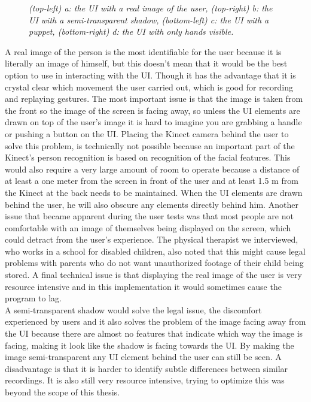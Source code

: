 \begin{figure}[H]
\begin{center}
 		\caption{\emph{(top-left) a: the UI with a real image of the user, (top-right) b: the UI with a semi-transparent shadow, (bottom-left) c: the UI with a puppet, (bottom-right) d: the UI with only hands visible. }}
 		\label{user visualizations}
 	\end{center}
 \end{figure}
 
 
A real image of the person is the most identifiable for the user because it is literally an image of himself, but this doesn't mean that it would be the best option to use in interacting with the UI. Though it has the advantage that it is crystal clear which movement the user carried out, which is good for recording and replaying gestures. The most important issue is that the image is taken from the front so the image of the screen is facing away, so unless the UI elements are drawn on top of the user's image it is hard to imagine you are grabbing a handle or pushing a button on the UI. Placing the Kinect camera behind the user to solve this problem, is technically not possible because an important part of the Kinect's person recognition is based on recognition of the facial features. This would also require a very large amount of room to operate because a distance of at least a one meter from the screen in front of the user and at least 1.5 m from the Kinect at the back needs to be maintained. When the UI elements are drawn behind the user, he will also obscure any elements directly behind him. Another issue that became apparent during the user tests was that most people are not comfortable with an image of themselves being displayed on the screen, which could detract from the user's experience. The physical therapist we interviewed, who works in a school for disabled children, also noted that this might cause legal problems with parents who do not want unauthorized footage of their child being stored. A final technical issue is that displaying the real image of the user is very resource intensive and in this implementation it would sometimes cause the program to lag.\\
 
A semi-transparent shadow would solve the legal issue, the discomfort experienced by users and it also solves the problem of the image facing away from the UI because there are almost no features that indicate which way the image is facing, making it look like the shadow is facing towards the UI. By making the image semi-transparent any UI element behind the user can still be seen. A disadvantage is that it is harder to identify subtle differences between similar recordings. It is also still very resource intensive, trying to optimize this was beyond the scope of this thesis.\\
 

